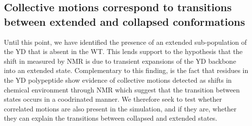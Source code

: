 \subsection{Collective motions correspond to transitions between extended and collapsed conformations}

Until this point, we have identified the presence of an extended sub-population of the YD \gct{} that is absent in the WT. This lends support to the hypothesis that the shift in \diffusion{} measured by NMR is due to transient expansions of the YD backbone into an extended state. Complementary to this finding, is the fact that residues in the YD polypeptide show evidence of collective motions detected as shifts in chemical environment through NMR  which suggest that the transition between states occurs in a coodrinated manner. We therefore seek to test whether correlated motions are also present in the simulation, and if they are, whether they can explain the transitions between collapsed and extended states.

